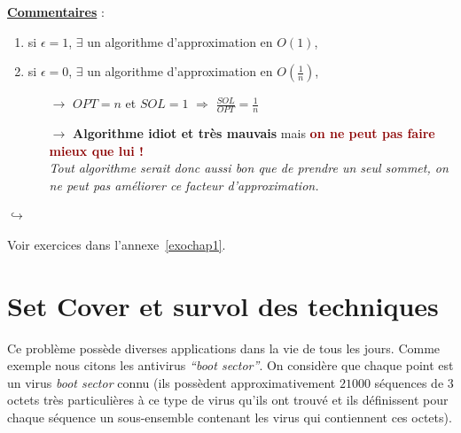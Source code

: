 \documentclass{article}
\newcommand{\rouge}[1]{\textcolor{darkred}{#1}}
\begin{document}
\begin{sffamily}
\begin{itemize}
\textbf{\underline{Commentaires}} :
\begin{enumerate}
\item si $\epsilon = 1$, $\exists$ un algorithme d'approximation en $O(1)$,
\item si $\epsilon = 0$, $\exists$ un algorithme d'approximation en $O(\frac{1}{n})$,
\begin{itemize}
\item[$\rightarrow$] $OPT = n$ et $SOL = 1$ $\Rightarrow$ $\frac{SOL}{OPT} = \frac{1}{n}$
\item[$\rightarrow$] \textbf{Algorithme idiot et très mauvais} mais \rouge{\textbf{on ne peut pas faire mieux que lui !}} \\
\textit{Tout algorithme serait donc aussi bon que de prendre un seul sommet, on ne peut pas améliorer ce facteur d'approximation.}
\end{itemize}
\end{enumerate}
\end{itemize}
\vspace{25em}
\begin{flushright}
$\hookrightarrow$ \begin{large}Voir exercices dans l'annexe~\ref{exochap1}.\end{large}
\end{flushright}

\section{Set Cover et survol des techniques}

Ce problème possède diverses applications dans la vie de tous les jours. Comme exemple nous citons les antivirus \textit{``boot
sector''}. On considère que chaque point est un virus \textit{boot sector} connu (ils possèdent approximativement $21 000$ séquences de
$3$ octets très particulières à ce type de virus qu'ils ont trouvé et ils définissent pour chaque séquence un sous-ensemble contenant les
virus qui contiennent ces octets).\\


\end{sffamily}
\end{document}
